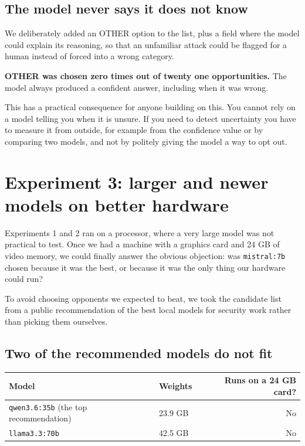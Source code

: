 \documentclass[11pt,a4paper]{article}
\begin{document}
\subsection{The model never says it does not know}

We deliberately added an OTHER option to the list, plus a field where the model could
explain its reasoning, so that an unfamiliar attack could be flagged for a human
instead of forced into a wrong category.

\textbf{OTHER was chosen zero times out of twenty one opportunities.} The model
always produced a confident answer, including when it was wrong.

This has a practical consequence for anyone building on this. You cannot rely on a
model telling you when it is unsure. If you need to detect uncertainty you have to
measure it from outside, for example from the confidence value or by comparing two
models, and not by politely giving the model a way to opt out.

\section{Experiment 3: larger and newer models on better hardware}

Experiments 1 and 2 ran on a processor, where a very large model was not practical to
test. Once we had a machine with a graphics card and 24 GB of video memory, we could
finally answer the obvious objection: was \texttt{mistral:7b} chosen because it was
the best, or because it was the only thing our hardware could run?

To avoid choosing opponents we expected to beat, we took the candidate list from a
public recommendation of the best local models for security work rather than picking
them ourselves.

\subsection{Two of the recommended models do not fit}

\begin{center}
\begin{tabular}{@{}llr@{}}
\toprule
\textbf{Model} & \textbf{Weights} & \textbf{Runs on a 24 GB card?} \\
\midrule
\texttt{qwen3.6:35b} (the top recommendation) & 23.9 GB & No \\
\texttt{llama3.3:70b}                         & 42.5 GB & No \\
\bottomrule
\end{tabular}
\end{center}
\end{document}
